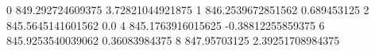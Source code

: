 0 849.292724609375 3.72821044921875
1 846.2539672851562 0.689453125
2 845.5645141601562 0.0
4 845.1763916015625 -0.38812255859375
6 845.9253540039062 0.36083984375
8 847.95703125 2.39251708984375
